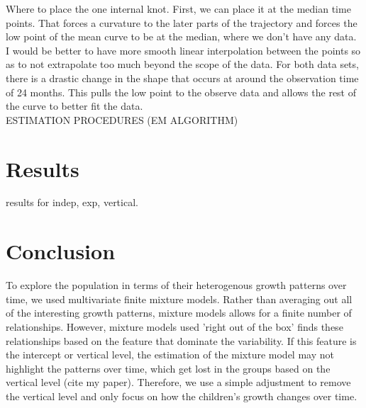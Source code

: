 \documentclass[11pt]{article}
\begin{document}
Where to place the one internal knot. First, we can place it at the median time points. That forces a curvature to the later parts of the trajectory and forces the low point of the mean curve to be at the median, where we don't have any data. I would be better to have more smooth linear interpolation between the points so as to not extrapolate too much beyond the scope of the data. For both data sets, there is a drastic change in the shape that occurs at around the observation time of 24 months. This pulls the low point to the observe data and allows the rest of the curve to better fit the data.
\\

ESTIMATION PROCEDURES (EM ALGORITHM)

\section{Results}

results for indep, exp, vertical. 


\section{Conclusion}
To explore the population in terms of their heterogenous growth patterns over time, we used multivariate finite mixture models. Rather than averaging out all of the interesting growth patterns, mixture models allows for a finite number of relationships. However, mixture models used 'right out of the box' finds these relationships based on the feature that dominate the variability. If this feature is the intercept or vertical level, the estimation of the mixture model may not highlight the patterns over time, which get lost in the groups based on the vertical level (cite my paper). Therefore, we use a simple adjustment to remove the vertical level and only focus on how the children's growth changes over time.\\\\



\begin{comment}




Using the corresponding techniques to select the number of clusters, we perform all types of cluster analysis on the data set. 
GRAPHS FOR EACH METHOD
TABLE WITH ESTIMATES FOR KEY CONCOMITANT VARIABLES FOR EACH METHOD

\end{comment}
\end{document}
